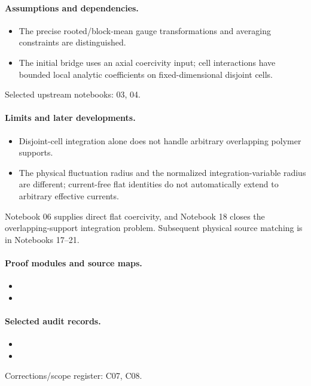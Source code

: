 \paragraph{Assumptions and dependencies.}
\begin{itemize}
\item The precise rooted/block-mean gauge transformations and averaging constraints are distinguished.
\item The initial bridge uses an axial coercivity input; cell interactions have bounded local analytic coefficients on fixed-dimensional disjoint cells.
\end{itemize}

Selected upstream notebooks: 03, 04.\par

\paragraph{Limits and later developments.}
\begin{itemize}
\item Disjoint-cell integration alone does not handle arbitrary overlapping polymer supports.
\item The physical fluctuation radius and the normalized integration-variable radius are different; current-free flat identities do not automatically extend to arbitrary effective currents.
\end{itemize}

Notebook 06 supplies direct flat coercivity, and Notebook 18 closes the overlapping-support integration problem. Subsequent physical source matching is in Notebooks 17--21.

\paragraph{Proof modules and source maps.}
\begingroup\small
\begin{itemize}
\item {}
\item {}
\end{itemize}
\endgroup

\paragraph{Selected audit records.}
\begingroup\small
\begin{itemize}
\item {}
\item {}
\end{itemize}
\endgroup
Corrections/scope register: C07, C08.\par

